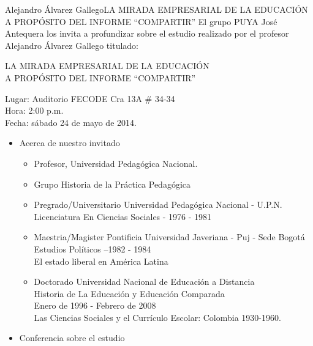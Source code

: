 \documentclass{beamer}
\begin{document}
\begin{frame}{Alejandro Álvarez Gallego}{LA MIRADA EMPRESARIAL DE LA EDUCACIÓN\\
A PROPÓSITO DEL INFORME “COMPARTIR”}
El grupo PUYA José Antequera los invita a profundizar sobre el estudio realizado por el profesor Alejandro Álvarez Gallego titulado:
\vspace*{10pt}
\begin{center}
\Large LA MIRADA EMPRESARIAL DE LA EDUCACIÓN\\
A PROPÓSITO DEL INFORME “COMPARTIR”
\end{center}
\vspace*{10pt}
Lugar: Auditorio FECODE Cra 13A \# 34-34\\
Hora: 2:00 p.m.\\
Fecha: sábado 24 de mayo de 2014.
\vspace*{5pt}
  \begin{itemize}
  \item 
    Acerca de nuestro invitado
    \begin{itemize}
    \item
      Profesor, Universidad Pedagógica Nacional.
    \item
      Grupo Historia de la Práctica Pedagógica
    \end{itemize}

    \begin{itemize}
    \item
      Pregrado/Universitario Universidad Pedagógica Nacional - U.P.N.\\
Licenciatura En Ciencias Sociales - 1976 - 1981
    \item
	Maestria/Magister Pontificia Universidad Javeriana - Puj - Sede Bogotá\\
Estudios Políticos --1982 - 1984\\
El estado liberal en América Latina
    \item
      Doctorado Universidad Nacional de Educación a Distancia\\
Historia de La Educación y Educación Comparada\\
Enero de 1996 - Febrero de 2008\\
Las Ciencias Sociales y el Currículo Escolar: Colombia 1930-1960.\\
    \end{itemize}
  \item
    Conferencia sobre el estudio

  \end{itemize}
\end{frame}
\end{document}
